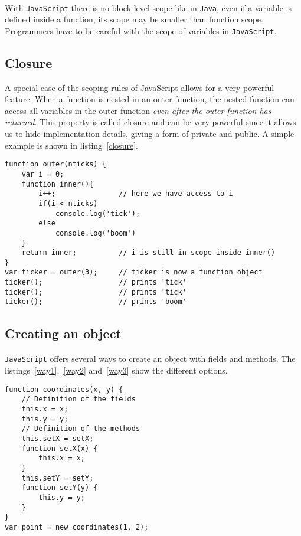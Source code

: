 \paragraph{}
With \texttt{JavaScript} there is no block-level scope like in \texttt{Java}, even if a variable is defined inside a function, its scope may be smaller than function scope. Programmers have to be careful with the scope of variables in \texttt{JavaScript}.
\subsection{Closure}
A special case of the scoping rules of JavaScript allows for a very powerful feature. When a function is nested in an outer function, the nested function can access all variables in the outer function \emph{even after the outer function has returned}. This property is called closure and can be very powerful since it allows us to hide implementation details, giving a form of private and public. A simple example is shown in listing~\ref{closure}.
\begin{lstlisting}[caption={Example of closure}, label={closure}]
function outer(nticks) {
	var i = 0;
	function inner(){
		i++;               // here we have access to i
		if(i < nticks)
			console.log('tick');
		else
			console.log('boom')
	}
	return inner;          // i is still in scope inside inner()
}
var ticker = outer(3);     // ticker is now a function object
ticker();                  // prints 'tick'
ticker();                  // prints 'tick'
ticker();                  // prints 'boom'
\end{lstlisting}
\subsection{Creating an object}
\paragraph{}
\texttt{JavaScript} offers several ways to create an object with fields and methods. The listings~\ref{way1},~\ref{way2} and~\ref{way3} show the different options.
        
\begin{lstlisting}[caption={Creating an object with a constructor}, label={way1}]
function coordinates(x, y) {
    // Definition of the fields
    this.x = x;
    this.y = y;
    // Definition of the methods
    this.setX = setX;
    function setX(x) {
        this.x = x;
    }
    this.setY = setY;
    function setY(y) {
        this.y = y;
    }
}
var point = new coordinates(1, 2);
\end{lstlisting}
        
